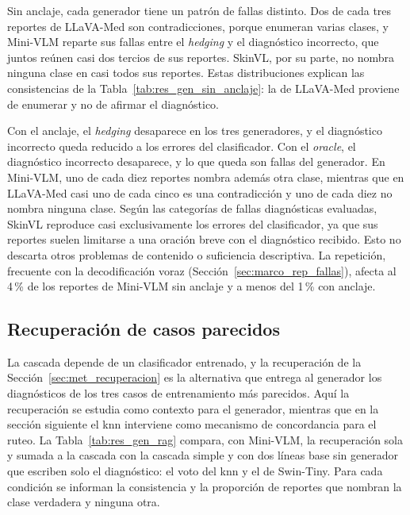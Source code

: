 Sin anclaje, cada generador tiene un patrón de fallas distinto. Dos de cada tres reportes de LLaVA-Med son
contradicciones, porque enumeran varias clases, y Mini-VLM reparte sus fallas entre el \emph{hedging} y el diagnóstico
incorrecto, que juntos reúnen casi dos tercios de sus reportes. SkinVL, por su parte, no nombra ninguna clase en casi todos sus reportes. Estas distribuciones explican las consistencias de la Tabla~\ref{tab:res_gen_sin_anclaje}: la de
LLaVA-Med proviene de enumerar y no de afirmar el diagnóstico.

Con el anclaje, el \emph{hedging} desaparece en los tres generadores, y el diagnóstico incorrecto queda reducido a los
errores del clasificador. Con el \emph{oracle}, el diagnóstico incorrecto desaparece, y lo que queda son fallas del
generador. En Mini-VLM, uno de cada diez reportes nombra además otra clase, mientras que en LLaVA-Med casi uno de cada
cinco es una contradicción y uno de cada diez no nombra ninguna clase. Según las categorías de fallas diagnósticas evaluadas, SkinVL reproduce casi exclusivamente los errores del clasificador, ya que sus reportes suelen limitarse a una oración breve con el diagnóstico recibido. Esto no descarta otros problemas de contenido o suficiencia descriptiva. La repetición, frecuente con la
decodificación voraz (Sección~\ref{sec:marco_rep_fallas}), afecta al 4\,\% de los reportes de Mini-VLM sin anclaje y a
menos del 1\,\% con anclaje.

\subsection{Recuperación de casos parecidos}
\label{sec:res_gen_rag}

La cascada depende de un clasificador entrenado, y la recuperación de la Sección~\ref{sec:met_recuperacion} es la
alternativa que entrega al generador los diagnósticos de los tres casos de entrenamiento más parecidos. Aquí la
recuperación se estudia como contexto para el generador, mientras que en la sección siguiente el \gls{knn} interviene
como mecanismo de concordancia para el ruteo. La
Tabla~\ref{tab:res_gen_rag} compara, con Mini-VLM, la recuperación sola y sumada a la cascada con la cascada simple y
con dos líneas base sin generador que escriben solo el diagnóstico: el voto del \gls{knn} y el de Swin-Tiny. Para cada
condición se informan la consistencia y la proporción de reportes que nombran la clase verdadera y ninguna otra.

